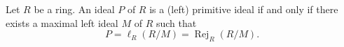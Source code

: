 Let $R$ be a ring. An ideal $P$ of $R$ is a (left) primitive ideal if and only if there exists a maximal left ideal $M$ of $R$ such that
$$P = \ell_R(R/M) = \operatorname{Rej}_R(R/M).$$
